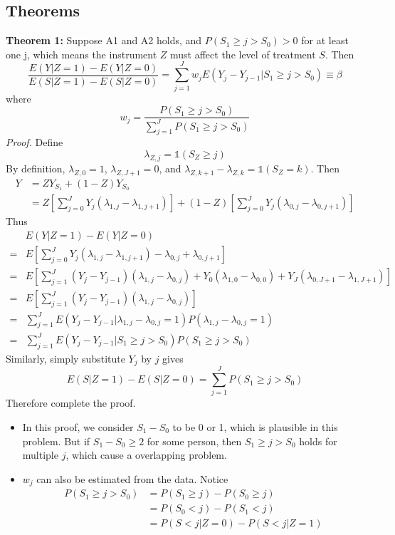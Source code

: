 \documentclass[a4paper,11pt]{article}
\begin{document}
\subsection{Theorems}
\textbf{Theorem 1:} Suppose A1 and A2 holds, and $P(S_1 \geq j>S_0) >0$ for at least one j, which means the instrument $Z$ must affect the level of treatment $S$. Then 
\[ 
\frac{E(Y|Z=1)-E(Y|Z=0)}{E(S|Z=1)-E(S|Z=0)}=\sum_{j=1}^J w_j E(Y_j-Y_{j-1}|S_1 \geq j>S_0) \equiv \beta
\]
where 
\[w_j=\frac{P(S_1 \geq j>S_0)}{\sum_{j=1}^J P(S_1 \geq j>S_0)}\]
{\it Proof.} Define 
\[\lambda_{Z,j}=\mathbb{1}(S_Z\geq j)\]
By definition, $\lambda_{Z,0}=1$, $\lambda_{Z,J+1}=0$, and $\lambda_{Z,k+1}-\lambda_{Z,k}=\mathbb{1}(S_Z=k)$. Then
\[\begin{aligned}
Y&=Z Y_{S_1}+(1-Z) Y_{S_0} \\
&=Z\left[\sum_{j=0}^J Y_j(\lambda_{1,j}-\lambda_{1,j+1})\right] + (1-Z)\left[\sum_{j=0}^J Y_j(\lambda_{0,j}-\lambda_{0,j+1})\right]
\end{aligned}\]
Thus
\[\begin{aligned}
&E(Y|Z=1)-E(Y|Z=0) \\
=&E\left[\sum_{j=0}^J Y_j(\lambda_{1,j}- \lambda_{1,j+1})-\lambda_{0,j}+\lambda_{0,j+1} \right] \\
=&E\left[\sum_{j=1}^J (Y_j-Y_{j-1})(\lambda_{1,j}-\lambda_{0,j})+Y_0 (\lambda_{1,0}-\lambda_{0,0})+Y_J(\lambda_{0,J+1}-\lambda_{1,J+1})\right] \\
=&E\left[\sum_{j=1}^J (Y_j-Y_{j-1})(\lambda_{1,j}-\lambda_{0,j}) \right] \\
=&\sum_{j=1}^J E(Y_j-Y_{j-1}|\lambda_{1,j}-\lambda_{0,j}=1) P(\lambda_{1,j}-\lambda_{0,j}=1) \\
=&\sum_{j=1}^J E(Y_j-Y_{j-1}|S_1 \geq j>S_0) P(S_1 \geq j>S_0)
\end{aligned}\]
Similarly, simply substitute $Y_j$ by $j$ gives
\[E(S|Z=1)-E(S|Z=0)=\sum_{j=1}^J P(S_1 \geq j>S_0)\]
Therefore complete the proof.
\begin{itemize}
\item 
In this proof, we consider $S_1-S_0$ to be 0 or 1, which is plausible in this problem. But if $S_1-S_0\geq 2$ for some person, then $S_1 \geq j>S_0$ holds for multiple $j$, which cause a overlapping problem.
\item
$w_j$ can also be estimated from the data. Notice
\[\begin{aligned}
P(S_{1} \geq j>S_{0}) &=P(S_{1} \geq j)-P(S_{0} \geq j) \\
&=P(S_{0}<j)-P(S_{1}<j) \\
&=P(S<j | Z=0)-P(S<j | Z=1) \\
\end{aligned}\]
\end{itemize}
\end{document}
